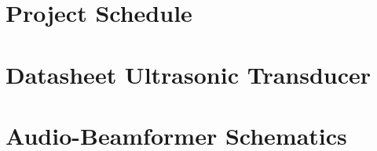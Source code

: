 \section{Project Schedule} \label{Project Schedule}
\enlargethispage{2.5cm}
\begin{adjustwidth}{0.23cm}{0cm} \hfuzz=7.0pt \vfuzz=19.0pt
\end{adjustwidth}
\newpage

\section{Datasheet Ultrasonic Transducer} \label{appendix_ma401a6}
\enlargethispage{2.5cm}
\begin{adjustwidth}{-0.23cm}{0cm} \hfuzz=7.0pt \vfuzz=20.0pt
\end{adjustwidth}
\newpage

\section{Audio-Beamformer Schematics} \label{Fleet-Monitor V1.0 Schematics}
\enlargethispage{2.5cm}
\begin{adjustwidth}{0.23cm}{0cm} \hfuzz=7.0pt \vfuzz=20.0pt
\end{adjustwidth}
\newpage

\begin{adjustwidth}{-0.23cm}{0cm} \hfuzz=7.0pt \vfuzz=20.0pt
\end{adjustwidth}
\newpage

\begin{adjustwidth}{0.23cm}{0cm} \hfuzz=7.0pt \vfuzz=20.0pt
\end{adjustwidth}
\newpage

\begin{adjustwidth}{-0.23cm}{0cm} \hfuzz=7.0pt \vfuzz=20.0pt
\end{adjustwidth}
\newpage

\begin{adjustwidth}{0.23cm}{0cm} \hfuzz=7.0pt \vfuzz=20.0pt
\end{adjustwidth}
\newpage

